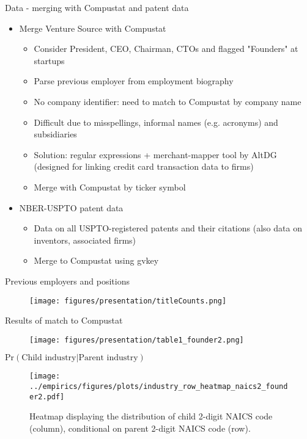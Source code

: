 \documentclass[english,usenames,dvipsnames]{beamer}
\begin{document}
\begin{frame}{Data - merging with Compustat and patent data}
\begin{itemize}
	\item Merge Venture Source with Compustat
	\begin{itemize}
		\item Consider President, CEO, Chairman, CTOs and flagged "Founders" at startups
		\item Parse previous employer from employment biography
		\item No company identifier: need to match to Compustat by company name
		\item Difficult due to misspellings, informal names (e.g. acronyms) and subsidiaries
		\item \alert{Solution:} regular expressions + merchant-mapper tool by AltDG (designed for linking credit card transaction data to firms)
		\item Merge with Compustat by ticker symbol
	\end{itemize}
	\item NBER-USPTO patent data
	\begin{itemize}
		\item Data on all USPTO-registered patents and their citations (also data on inventors, associated firms)
		\item Merge to Compustat using gvkey
	\end{itemize}
\end{itemize}
\end{frame}

\begin{frame}{Previous employers and positions}
	\begin{figure}
		\texttt{[image: figures/presentation/titleCounts.png]}
	\end{figure}
\end{frame}

\begin{frame}{Results of match to Compustat}
\begin{figure}
	\texttt{[image: figures/presentation/table1\_founder2.png]}
\end{figure}
\end{frame}

\begin{frame}{$\mathrm{Pr}(\textrm{Child industry} | \textrm{Parent industry})$}
\begin{figure}
	\texttt{[image: ../empirics/figures/plots/industry\_row\_heatmap\_naics2\_founder2.pdf]}
	\caption{\footnotesize Heatmap displaying the distribution of child 2-digit NAICS code (column), conditional on parent 2-digit NAICS code (row).}
\end{figure}
\end{frame}
\end{document}
